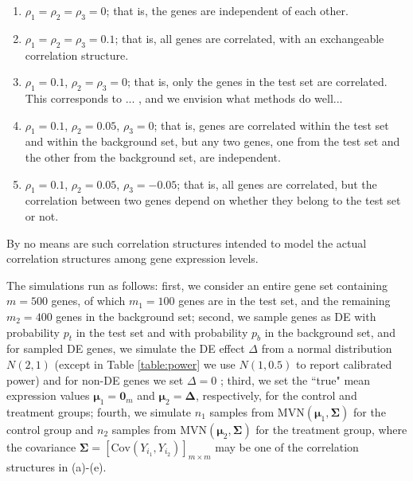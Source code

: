 \documentclass[a4,center,fleqn]{NAR}
\newcommand{\aaCase}{a}
\newcommand{\aCase}{c}
\newcommand{\cCase}{b}
\newcommand{\eCase}{d}
\newcommand{\fCase}{e}
\begin{document}
	\begin{enumerate}
		\item[(\aaCase):] $\rho_1 = \rho_2 = \rho_3 = 0$; that is, the genes are independent of each
		other.
		\item[(\cCase):] $\rho_1 = \rho_2 = \rho_3 = 0.1$; that is, all genes are correlated, with an
		exchangeable correlation structure. 
		\item[(\aCase):] $\rho_1 = 0.1$, $\rho_2 = \rho_3 = 0$; that is, only the genes in the test set
		are correlated. This corresponds to ... , and we envision what methods do well...
		\item[(\eCase):] $\rho_1 = 0.1$, $\rho_2 = 0.05$, $\rho_3 = 0$; that is, 
		genes are correlated within the test set and within the background set, but any two genes, one
		from the test set and the other from the background set, are independent.
		\item[(\fCase):] $\rho_1 = 0.1$, $\rho_2 = 0.05$, $\rho_3 = -0.05$; that is, all genes are
		correlated, but the correlation between two genes depend on whether they belong to the test set or
		not.
	\end{enumerate}
	By no means are such correlation structures intended to model the actual correlation structures among gene expression levels.
	
	The simulations run as follows: first, we consider an entire gene set containing $m=500$ genes,
	of which $m_1 = 100$ genes are in the test set, and the
	remaining $m_2=400$ genes in the background set; second, we sample genes as DE with probability $p_t$ in the test set and with probability $p_b$ in the background set, and for sampled DE genes, we simulate the DE effect $\Delta$ from  a normal distribution $N(2, 1)$ (except in Table \ref{table:power} we use $N(1, 0.5)$ to report calibrated power) and for non-DE genes we set $\Delta= 0$ ; third, we set the ``true" mean expression values $\bm \mu_1 = \bm 0_m$ and $\bm \mu_2 = \bm \Delta$, respectively,
	for the control and treatment groups; fourth, we simulate $n_1$ samples from $\text{MVN}(\bm \mu_1,
	\bm \Sigma)$ for the control group and $n_2$ samples from $\text{MVN}(\bm \mu_2, \bm \Sigma)$ for
	the treatment group, where the covariance $\bm \Sigma = \left[\text{Cov}(Y_{i_1},
	Y_{i_2})\right]_{m\times m}$ may be one of the correlation structures in (\aaCase)-(\fCase).
	
\end{document}
